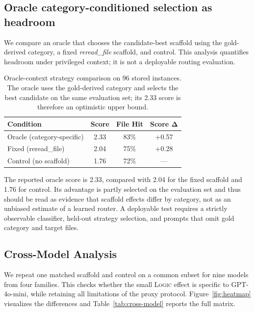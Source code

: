 \documentclass{article}
\begin{document}
\subsection{Oracle category-conditioned selection as headroom}
\label{sec:strategy-selection}

We compare an oracle that chooses the candidate-best scaffold using the
gold-derived category, a fixed \emph{reread\_file} scaffold, and control.  This
analysis quantifies headroom under privileged context; it is not a deployable
routing evaluation.

\begin{table}[H]
\centering
\small
\setlength{\tabcolsep}{4pt}
\begin{tabular}{@{}lccc@{}}
\toprule
\textbf{Condition} & \textbf{Score} & \textbf{File Hit} & \textbf{Score $\boldsymbol{\Delta}$} \\
\midrule
Oracle (category-specific) & 2.33 & 83\% & +0.57 \\
Fixed (reread\_file) & 2.04 & 75\% & +0.28 \\
Control (no scaffold) & 1.76 & 72\% & --- \\
\bottomrule
\end{tabular}
\caption{Oracle-context strategy comparison on 96 stored instances.  The
oracle uses the gold-derived category and selects the best candidate on the
same evaluation set; its 2.33 score is therefore an optimistic upper bound.}
\label{tab:strategy-selection}
\end{table}

The reported oracle score is 2.33, compared with 2.04 for the fixed scaffold and
1.76 for control.  Its advantage is partly selected on the evaluation set and
thus should be read as evidence that scaffold effects differ by category, not
as an unbiased estimate of a learned router.  A deployable test requires a
strictly observable classifier, held-out strategy selection, and prompts that
omit gold category and target files.

\subsection{Cross-Model Analysis}
\label{sec:cross-model}

We repeat one matched scaffold and control on a common subset for nine models
from four families.  This checks whether the small \textsc{Logic} effect is
specific to GPT-4o-mini, while retaining all limitations of the proxy protocol.
Figure~\ref{fig:heatmap} visualizes the differences and
Table~\ref{tab:cross-model} reports the full matrix.
\end{document}
